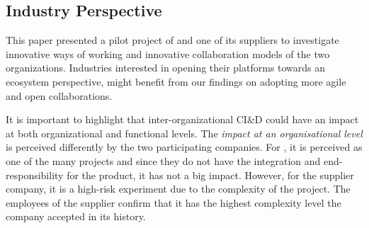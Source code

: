 \subsection{Industry Perspective}\label{sec:industry}

This paper presented a pilot project of \company{} and one of its suppliers to investigate innovative ways of working and innovative collaboration models of the two organizations. 
Industries %
interested in %
opening their platforms towards an ecosystem perspective, %
might benefit from our findings %
on adopting more agile and open collaborations. %

It is important to highlight that inter-orga\-ni\-za\-tional CI\&D could have an impact at both organizational and functional levels. 
%
%
The {\em impact at an organisational level} is perceived differently by the two participating companies. For \company{}, it is perceived as one of the many projects and since they do not have the integration and end-responsibility for the product, it has not a big impact. However, for the supplier company, it is a high-risk experiment due to the complexity of the project. The employees of the supplier confirm that it has the highest complexity level the company accepted in its history.

